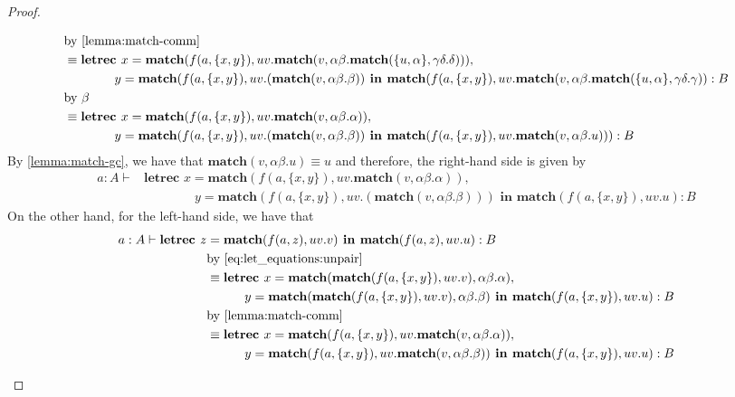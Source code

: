\begin{example}
\begin{proof}
\begin{itemize}
\begin{align*}
&\text{by \cref{lemma:match-comm}}\\
&\equiv \textbf{letrec } x = \textbf{match}(f(a,\{x,y\}), uv.\textbf{match}(v, \alpha\beta.\textbf{match}(\{u,\alpha\}, \gamma\delta.\delta))),\\
&\hspace{4em} y = \textbf{match}(f(a,\{x,y\}), uv.(\textbf{match}(v, \alpha\beta.\beta)) \textbf{ in } \textbf{match}(f(a,\{x,y\}), uv.\textbf{match}(v, \alpha\beta.\textbf{match}(\{u,\alpha\}, \gamma\delta.\gamma)) : B\\
&\text{by $\beta$}\\
&\equiv \textbf{letrec } x = \textbf{match}(f(a,\{x,y\}), uv.\textbf{match}(v, \alpha\beta.\alpha)),\\
&\hspace{4em} y = \textbf{match}(f(a,\{x,y\}), uv.(\textbf{match}(v, \alpha\beta.\beta)) \textbf{ in } \textbf{match}(f(a,\{x,y\}), uv.\textbf{match}(v, \alpha\beta.u))) : B\\
\end{align*}
By \cref{lemma:match-gc}, we have that $\textbf{match}(v, \alpha\beta.u) \equiv u$ and therefore, the right-hand side is given by
\begin{align*}
a : A \vdash &\textbf{letrec } x = \textbf{match}(f(a,\{x,y\}), uv.\textbf{match}(v, \alpha\beta.\alpha)),\\
&\hspace{4em} y = \textbf{match}(f(a,\{x,y\}), uv.(\textbf{match}(v,\alpha\beta.\beta))) \textbf{ in } \textbf{match}(f(a,\{x,y\}), uv.u) : B
\end{align*}
On the other hand, for the left-hand side, we have that
\begin{align*}
a : A \vdash \textbf{letrec } z &= \textbf{match}(f(a,z), uv.v) \textbf{ in } \textbf{match}(f(a,z), uv.u) : B\\
&\text{by \cref{eq:let_equations:unpair}}\\
&\equiv \textbf{letrec } x = \textbf{match}(\textbf{match}(f(a,\{x,y\}), uv.v), \alpha\beta.\alpha),\\
& \hspace{3em}y = \textbf{match}(\textbf{match}(f(a,\{x,y\}), uv.v), \alpha\beta.\beta) \textbf{ in } \textbf{match}(f(a,\{x,y\}), uv.u) : B\\ 
&\text{by \cref{lemma:match-comm}}\\
&\equiv \textbf{letrec } x = \textbf{match}(f(a,\{x,y\}), uv.\textbf{match}(v, \alpha\beta.\alpha)),\\
& \hspace{3em}y = \textbf{match}(f(a,\{x,y\}), uv.\textbf{match}(v, \alpha\beta.\beta)) \textbf{ in } \textbf{match}(f(a,\{x,y\}), uv.u) : B\\ 

\end{align*}
\end{itemize}
\end{proof}
\end{example}
